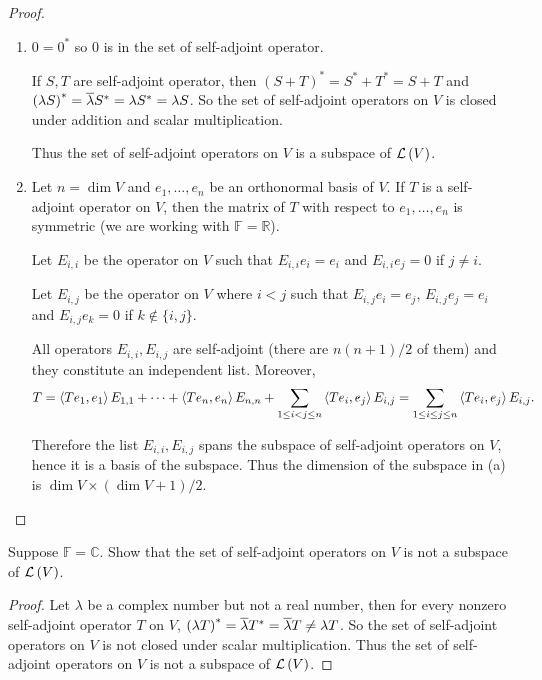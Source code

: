 \begin{proof}
    \begin{enumerate}[label={(\alph*)}]
        \item $0 = 0^{*}$ so $0$ is in the set of self-adjoint operator.

              If $S, T$ are self-adjoint operator, then ${(S + T)}^{*} = {S^{*} + T^{*}} = S + T$ and ${(\lambda S)}^{*} = \overline{\lambda}S^{*} = \lambda S^{*} = \lambda S$. So the set of self-adjoint operators on $V$ is closed under addition and scalar multiplication.

              Thus the set of self-adjoint operators on $V$ is a subspace of $\mathcal{L}\left({V}\right)$.
        \item Let $n = \dim V$ and $e_{1}, \ldots, e_{n}$ be an orthonormal basis of $V$. If $T$ is a self-adjoint operator on $V$, then the matrix of $T$ with respect to $e_{1}, \ldots, e_{n}$ is symmetric (we are working with $\mathbb{F} = \mathbb{R}$).

              Let $E_{i,i}$ be the operator on $V$ such that $E_{i,i}e_{i} = e_{i}$ and $E_{i,i}e_{j} = 0$ if $j\ne i$.

              Let $E_{i,j}$ be the operator on $V$ where $i<j$ such that $E_{i,j}e_{i} = e_{j}$, $E_{i,j}e_{j} = e_{i}$ and $E_{i,j}e_{k} = 0$ if $k\notin\{i, j\}$.

              All operators $E_{i,i}, E_{i,j}$ are self-adjoint (there are $n(n + 1)/2$ of them) and they constitute an independent list. Moreover,
              \[
                  T = \left\langle{Te_{1}, e_{1}}\right\rangle E_{1,1} + \cdots + \left\langle{Te_{n}, e_{n}}\right\rangle E_{n,n} + \sum_{1\leq i < j\leq n}\left\langle{Te_{i}, e_{j}}\right\rangle E_{i, j} = \sum_{1\leq i\leq j\leq n}\left\langle{Te_{i}, e_{j}}\right\rangle E_{i,j}.
              \]

              Therefore the list $E_{i,i}, E_{i,j}$ spans the subspace of self-adjoint operators on $V$, hence it is a basis of the subspace. Thus the dimension of the subspace in (a) is $\dim V \times (\dim V + 1)/2$.
    \end{enumerate}
\end{proof}
\newpage

\begin{exercise}
    Suppose $\mathbb{F} = \mathbb{C}$. Show that the set of self-adjoint operators on $V$ is not a subspace of $\mathcal{L}\left({V}\right)$.
\end{exercise}

\begin{proof}
    Let $\lambda$ be a complex number but not a real number, then for every nonzero self-adjoint operator $T$ on $V$, ${(\lambda T)}^{*} = \overline{\lambda}T^{*} = \overline{\lambda}T \ne \lambda T$. So the set of self-adjoint operators on $V$ is not closed under scalar multiplication. Thus the set of self-adjoint operators on $V$ is not a subspace of $\mathcal{L}\left({V}\right)$.
\end{proof}
\newpage

